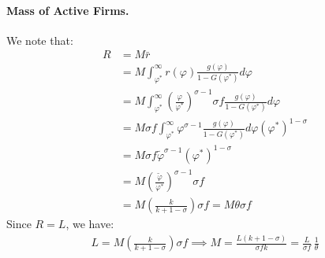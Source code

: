 \begin{solution}
\paragraph{Mass of Active Firms.} We note that:
\begin{align*}
R &= M \bar{r} \\
&= M \int_{\varphi^*}^{\infty} r(\varphi) \frac{g(\varphi)}{1 - G(\varphi^*)} d\varphi \\
&= M \int_{\varphi^*}^{\infty} \left(\frac{\varphi}{\varphi^*}\right)^{\sigma - 1} \sigma f \frac{g(\varphi)}{1 - G(\varphi^*)} d\varphi \\
&= M \sigma f \int_{\varphi^*}^{\infty} \varphi^{\sigma - 1} \frac{g(\varphi)}{1 - G(\varphi^*)} d\varphi \left(\varphi^*\right)^{1 - \sigma} \\
&= M \sigma f \tilde{\varphi}^{\sigma - 1} \left(\varphi^*\right)^{1 - \sigma} \\
&= M \left(\frac{\tilde{\varphi}}{\varphi^*}\right)^{\sigma - 1} \sigma f \\
&= M \left( \frac{k}{k + 1 - \sigma} \right) \sigma f = M \theta \sigma f
\end{align*}
Since $R = L$, we have:
\begin{align*}
L = M \left( \frac{k}{k + 1 - \sigma} \right) \sigma f \implies M = \frac{L (k + 1 - \sigma)}{\sigma f k} = \frac{L}{\sigma f}\,\frac{1}{\theta}
\end{align*}


\end{solution}
